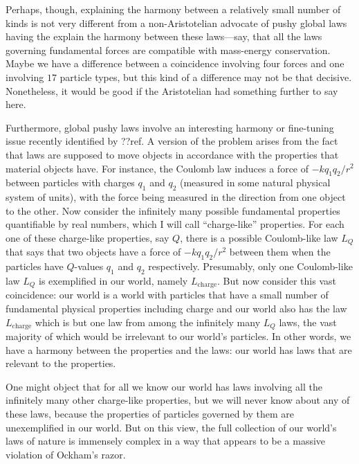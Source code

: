 Perhaps, though, explaining the harmony between a relatively small number of kinds is not very different from 
a non-Aristotelian advocate of pushy global laws having the explain the harmony between these laws---say, that 
all the laws governing fundamental forces are compatible with mass-energy conservation. Maybe we have a difference
between a coincidence involving four forces and one involving $17$ particle types, but this kind of a difference 
may not be that decisive. Nonetheless, it would be good if the Aristotelian had something further to say here.

Furthermore, global pushy laws involve an interesting harmony or fine-tuning issue recently identified by ??ref. A version 
of the problem arises from the fact that laws are supposed to move objects in accordance with the properties that 
material objects have. For instance, the Coulomb law induces a force of $-k q_1 q_2/r^2$ between particles with charges 
$q_1$ and $q_2$ (measured in some natural physical system of units), with the force being measured in the direction from 
one object to the other. Now consider the infinitely many possible 
fundamental properties quantifiable by real numbers, which I will call ``charge-like'' properties. For each one of these
charge-like properties, say $Q$, there is a possible 
Coulomb-like law $L_Q$ that says that two objects have a force of $-k q_1 q_2/r^2$ between them when the particles have 
$Q$-values $q_1$ and $q_2$ respectively. Presumably, only one Coulomb-like law $L_Q$ is exemplified in our world, namely
$L_{\text{charge}}$. But now consider this vast coincidence: our world is a world with particles that have a small
number of fundamental physical properties including charge and our world also has the law $L_{\text{charge}}$ which is 
but one law from among the infinitely many $L_Q$ laws, the vast majority of which would be irrelevant to our world's 
particles. In other words, we have a harmony between the properties and the laws: our world has laws that are relevant 
to the properties.

One might object that for all we know our world has laws involving all the infinitely many other charge-like properties,
but we will never know about any of these laws, because the properties of particles governed by them are unexemplified
in our world. But on this view, the full collection of our world's laws of nature is immensely complex in a way that 
appears to be a massive violation of Ockham's razor. 

